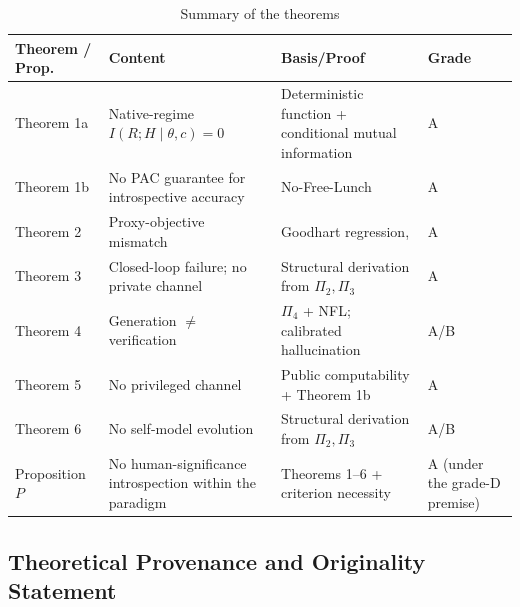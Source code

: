 \begin{table}[htbp]
\centering
\caption{Summary of the theorems\label{tab:summary}}
\begin{tabular}{p{2.8cm}p{5.0cm}p{4.8cm}p{1.6cm}}
\toprule
Theorem / Prop. & Content & Basis/Proof & Grade \\
\midrule
Theorem 1a & Native-regime $I(R;H\mid\theta,c)=0$ & Deterministic function + conditional mutual information & A \\
Theorem 1b & No PAC guarantee for introspective accuracy & No-Free-Lunch \cite{shalev-shwartz-2014} & A \\
Theorem 2 & Proxy-objective mismatch & Goodhart regression\cite{manheim-garrabrant-2018-goodhart},
\cite{skalse-2022-reward-hacking} & A \\
Theorem 3 & Closed-loop failure; no private channel & Structural derivation from $\Pi_2,\Pi_3$ & A \\
Theorem 4 & Generation $\neq$ verification & $\Pi_4$ + NFL; calibrated hallucination\cite{kalai-vempala-2023-calib} & A/B \\
Theorem 5 & No privileged channel & Public computability + Theorem 1b & A \\
Theorem 6 & No self-model evolution & Structural derivation from $\Pi_2,\Pi_3$ & A/B \\
Proposition $P$ & No human-significance introspection within the paradigm & Theorems 1--6 + criterion necessity & A (under the grade-D premise) \\
\bottomrule
\end{tabular}
\end{table}

\subsection{Theoretical Provenance and Originality Statement}

